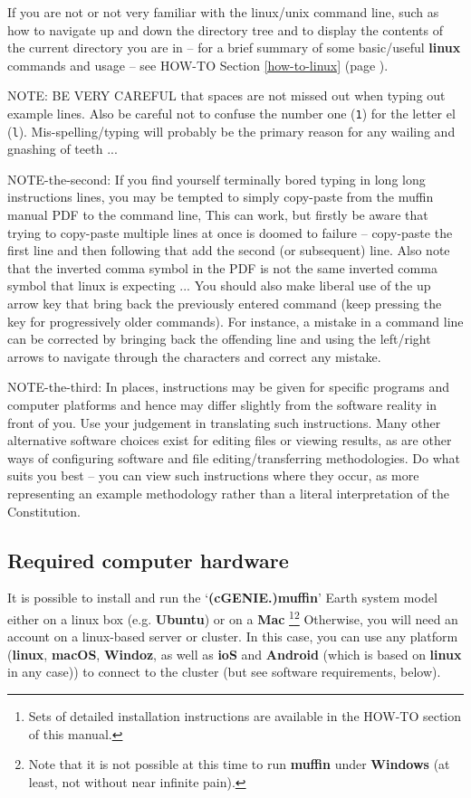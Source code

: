 \documentclass[11pt,fleqn]{book} %
\begin{document}
If you are not or not very familiar with the linux/unix command line, such as how to navigate up and down the directory tree and to display the contents of the current directory you are in – for a brief summary of some basic/useful \textbf{linux} commands and usage -- see HOW-TO Section \ref{how-to-linux} (page \pageref{how-to-linux}).

NOTE: BE VERY CAREFUL that spaces are not missed out when typing out example lines. Also be careful not to confuse the number one (\texttt{1}) for the letter el (\texttt{l}). Mis-spelling/typing will probably be the primary reason for any wailing and gnashing of teeth ... 

NOTE-the-second: If you find yourself terminally bored typing in long long instructions lines, you may be tempted to simply copy-paste from the muffin manual PDF to the command line, This can work, but firstly be aware that trying to copy-paste multiple lines at once is doomed to failure -- copy-paste the first line and then following that add the second (or subsequent) line.
Also note that the inverted comma symbol in the PDF is not the same inverted comma symbol that linux is expecting ... You should also make liberal use of the up arrow key that bring back the previously entered command (keep pressing the key for progressively older commands). For instance, a mistake in a command line can be corrected by bringing back the offending line and using the left/right arrows to navigate through the characters and correct any mistake.

NOTE-the-third: In places, instructions may be given for specific programs and computer platforms and hence may differ slightly from the software reality in front of you. Use your judgement in translating such instructions. Many other alternative software choices exist for editing files or viewing results, as are other ways of configuring software and file editing/transferring methodologies. Do what suits you best – you can view such instructions where they occur, as  more representing an example methodology rather than a literal interpretation of the Constitution.


\subsection*{Required computer hardware}

It is  possible to install and run the ‘\textbf{(cGENIE.)muffin}’ Earth system model either on a linux box (e.g. \textbf{Ubuntu}) or on a \textbf{Mac} \footnote{Sets of detailed installation instructions are available in the HOW-TO section of this manual.}\footnote{Note that it is not possible at this time to run \textbf{muffin} under \textbf{Windows} (at least, not without near infinite pain).} Otherwise, you will need an account on a linux-based server or cluster. In this case, you can use any platform (\textbf{linux}, \textbf{macOS}, \textbf{Windoz}, as well as \textbf{ioS} and \textbf{Android} (which is based on \textbf{linux} in any case)) to connect to the cluster (but see software requirements, below).
\end{document}
